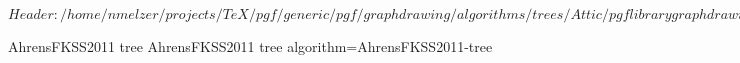 %
%
%

\ProvidesFileRCS[v\pgfversion] $Header: /home/nmelzer/projects/TeX/pgf/generic/pgf/graphdrawing/algorithms/trees/Attic/pgflibrarygraphdrawing.trees.code.tex,v 1.4 2011/10/16 08:40:10 jannis-pohlmann Exp $



%
%

%
%
% 
% 




% 
% 





%
%
%
%

\pgfgddeclarealgorithmkey
{AhrensFKSS2011 tree}
{AhrensFKSS2011 tree}
{algorithm=AhrensFKSS2011-tree}




\endinput
